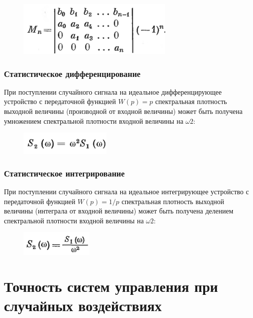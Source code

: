 \documentclass[14pt,a4paper,report]{report}
\begin{document}
\begin{figure}[h!]
	\centering
	\includegraphics[scale = 0.65]{images/10.png}
	\label{image:10}
\end{figure}

\subsubsection{Статистическое дифференцирование}

При поступлении случайного сигнала на идеальное дифференцирующее устройство с передаточной функцией $W(p)=p$ спектральная плотность выходной величины (производной от входной величины) может быть получена умножением спектральной плотности входной величины на $\omega2$:

\begin{figure}[h!]
	\centering
	\includegraphics[scale = 0.79]{images/11.png}
	\label{image:11}
\end{figure}

\subsubsection{Статистическое интегрирование}

При поступлении случайного сигнала на идеальное интегрирующее устройство с передаточной функцией $W(p)=1/p$ спектральная плотность выходной величины (интеграла от входной величины) может быть получена делением спектральной плотности входной величины на $\omega2$:

\begin{figure}[h!]
	\centering
	\includegraphics[scale = 0.79]{images/12.png}
	\label{image:12}
\end{figure}

\section{Точность систем управления при случайных воздействиях}
\end{document}
